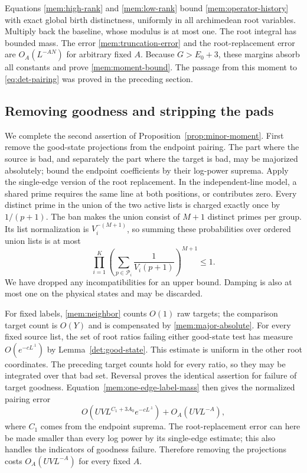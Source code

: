 Equations \eqref{mem:high-rank} and \eqref{mem:low-rank} bound
\eqref{mem:operator-history} with exact global birth distinctness,
uniformly in all archimedean root variables. Multiply back the
baseline, whose modulus is at most one. The root integral has bounded
mass. The error \eqref{mem:truncation-error} and the root-replacement
error are $O_A(L^{-AN})$ for arbitrary fixed $A$. Because
$G>E_0+3$, these margins absorb all constants and prove
\eqref{mem:moment-bound}. The passage from this moment to
\eqref{eq:det-pairing} was proved in the preceding section.

\subsection{Removing goodness and stripping the pads}

We complete the second assertion of
Proposition~\ref{prop:minor-moment}. First remove the good-state
projections from the endpoint pairing. The part where the source is
bad, and separately the part where the target is bad, may be
majorized absolutely; bound the endpoint coefficients by their
log-power suprema. Apply the single-edge version of the root
replacement. In the independent-line model, a shared prime requires
the same line at both positions, or contributes zero. Every distinct
prime in the union of the two active lists is charged exactly once
by $1/(p+1)$. The ban makes the union consist of $M+1$ distinct primes
per group. Its list normalization is $V_i^{-(M+1)}$, so summing these
probabilities over ordered union lists is at most
\begin{equation}\label{mem:one-edge-label-mass}
 \prod_{i=1}^K
 \left(\sum_{p\in\mathcal P_i}\frac1{V_i(p+1)}\right)^{M+1}
 \le1.
\end{equation}
We have dropped any incompatibilities for an upper bound. Damping
is also at most one on the physical states and may be discarded.

For fixed labels, \eqref{mem:neighbor} counts $O(1)$ raw targets;
the comparison target count is $O(Y)$ and is compensated by
\eqref{mem:major-absolute}. For every fixed source list, the set of
root ratios failing either good-state test has measure
$O(e^{-cL^{.1}})$ by Lemma~\ref{det:good-state}. This estimate
is uniform in the other root coordinates. The preceding target
counts hold for every ratio, so they may be integrated over that bad
set. Reversal proves the identical assertion for failure of target
goodness. Equation~\eqref{mem:one-edge-label-mass} then gives the
normalized pairing error
\begin{equation}\label{mem:goodness-error}
 O\!\left(UV L^{C_1+3A_0}e^{-cL^{.1}}\right)
       +O_A(UV L^{-A}),
\end{equation}
where $C_1$ comes from the endpoint suprema. The root-replacement
error can here be made smaller than every log power by its
single-edge estimate; this also handles the indicators of goodness
failure. Therefore removing the projections costs
$O_A(UV L^{-A})$ for every fixed $A$.

